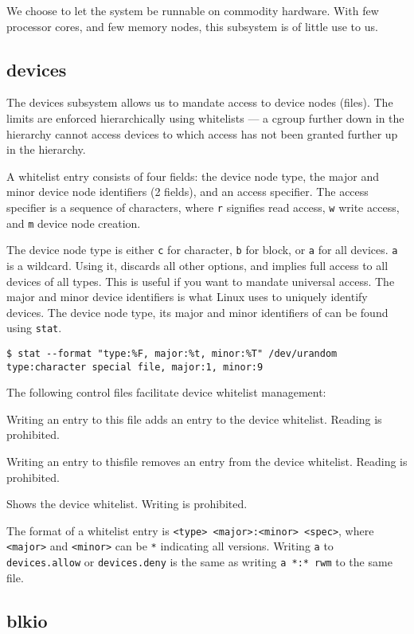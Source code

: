 We choose to let the system be runnable on commodity hardware. With few
processor cores, and few memory nodes, this subsystem is of little use to us.

\subsection{devices}

The devices subsystem allows us to mandate access to device nodes
(files)\cite{devices.txt}. The limits are enforced hierarchically using
whitelists --- a cgroup further down in the hierarchy cannot access devices to
which access has not been granted further up in the hierarchy.

A whitelist entry consists of four fields: the device node type, the major and
minor device node identifiers (2 fields), and an access specifier. The access
specifier is a sequence of characters, where \texttt{r} signifies read access,
\texttt{w} write access, and \texttt{m} device node creation.

The device node type is either \texttt{c} for character, \texttt{b} for block,
or \texttt{a} for all devices. \texttt{a} is a wildcard. Using it, discards all
other options, and implies full access to all devices of all types. This is
useful if you want to mandate universal access. The major and minor device
identifiers is what Linux uses to uniquely identify devices.  The device node
type, its major and minor identifiers of can be found using \texttt{stat}. 

\begin{lstlisting}
$ stat --format "type:%F, major:%t, minor:%T" /dev/urandom 
type:character special file, major:1, minor:9
\end{lstlisting}

The following control files facilitate device whitelist management:

\begin{description}[\setleftmargin{0.2in}\breaklabel\setlabelstyle{\tt}]

\item[devices.allow] Writing an entry to this file adds an entry to the device
whitelist. Reading is prohibited.

\item[devices.deny] Writing an entry to thisfile removes an entry from the
device whitelist. Reading is prohibited.

\item[devices.list] Shows the device whitelist. Writing is prohibited.

\end{description}

The format of a whitelist entry is \texttt{<type> <major>:<minor> <spec>},
where \texttt{<major>} and \texttt{<minor>} can be \texttt{*} indicating all
versions. Writing \texttt{a} to \texttt{devices.allow} or \texttt{devices.deny}
is the same as writing \texttt{a *:* rwm} to the same file.

\subsection{blkio}
